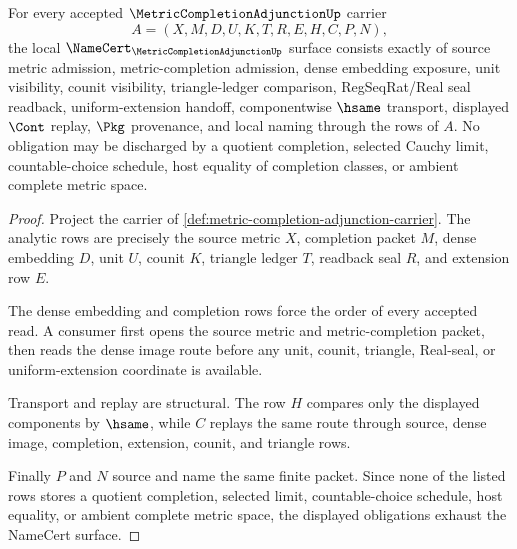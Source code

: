 \begin{theorem}
\label{thm:metric-completion-adjunction-namecert-obligations}
For every accepted $\MetricCompletionAdjunctionUp$ carrier
$$
A=(X,M,D,U,K,T,R,E,H,C,P,N),
$$
the local $\NameCert_{\MetricCompletionAdjunctionUp}$ surface consists exactly of source metric admission, metric-completion admission, dense embedding exposure, unit visibility, counit visibility, triangle-ledger comparison, RegSeqRat/Real seal readback, uniform-extension handoff, componentwise $\hsame$ transport, displayed $\Cont$ replay, $\Pkg$ provenance, and local naming through the rows of $A$. No obligation may be discharged by a quotient completion, selected Cauchy limit, countable-choice schedule, host equality of completion classes, or ambient complete metric space.
\end{theorem}
\begin{proof}
Project the carrier of \autoref{def:metric-completion-adjunction-carrier}. The analytic rows are precisely the source metric $X$, completion packet $M$, dense embedding $D$, unit $U$, counit $K$, triangle ledger $T$, readback seal $R$, and extension row $E$.

The dense embedding and completion rows force the order of every accepted read. A consumer first opens the source metric and metric-completion packet, then reads the dense image route before any unit, counit, triangle, Real-seal, or uniform-extension coordinate is available.

Transport and replay are structural. The row $H$ compares only the displayed components by $\hsame$, while $C$ replays the same route through source, dense image, completion, extension, counit, and triangle rows.

Finally $P$ and $N$ source and name the same finite packet. Since none of the listed rows stores a quotient completion, selected limit, countable-choice schedule, host equality, or ambient complete metric space, the displayed obligations exhaust the NameCert surface.
\end{proof}

